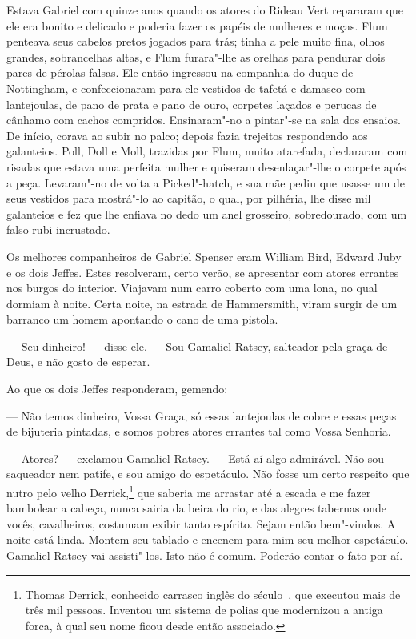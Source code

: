 Estava Gabriel com quinze anos quando os atores do Rideau Vert repararam
que ele era bonito e delicado e poderia fazer os papéis de mulheres e
moças. Flum penteava seus cabelos pretos jogados para trás; tinha a pele
muito fina, olhos grandes, sobrancelhas altas, e Flum furara"-lhe as
orelhas para pendurar dois pares de pérolas falsas. Ele então ingressou na
companhia do duque de Nottingham, e confeccionaram para ele vestidos de
tafetá e damasco com lantejoulas, de pano de prata e pano de ouro,
corpetes laçados e perucas de cânhamo com cachos compridos. Ensinaram"-no a
pintar"-se na sala dos ensaios. De início, corava ao subir no palco; depois
fazia trejeitos respondendo aos galanteios. Poll, Doll e Moll, trazidas
por Flum, muito atarefada, declararam com risadas que estava uma perfeita
mulher e quiseram desenlaçar"-lhe o corpete após a peça. Levaram"-no de
volta a Picked"-hatch, e sua mãe pediu que usasse um de seus vestidos para
mostrá"-lo ao capitão, o qual, por pilhéria, lhe disse mil galanteios e fez
que lhe enfiava no dedo um anel grosseiro, sobredourado, com um falso rubi
incrustado.

Os melhores companheiros de Gabriel Spenser eram William Bird, Edward Juby
e os dois Jeffes. Estes resolveram, certo verão, se apresentar com atores
errantes nos burgos do interior. Viajavam num carro coberto com uma lona,
no qual dormiam à noite. Certa noite, na estrada de Hammersmith, viram
surgir de um barranco um homem apontando o cano de uma pistola.

--- Seu dinheiro! --- disse ele. --- Sou Gamaliel Ratsey, salteador pela graça de
Deus, e não gosto de esperar.

Ao que os dois Jeffes responderam, gemendo:

--- Não temos dinheiro, Vossa Graça, só essas lantejoulas de cobre e essas
peças de bijuteria pintadas, e somos pobres atores errantes tal como Vossa
Senhoria.

--- Atores? --- exclamou Gamaliel Ratsey. --- Está aí algo admirável. Não sou
saqueador nem patife, e sou amigo do espetáculo. Não fosse um certo
respeito que nutro pelo velho Derrick,\footnote{ Thomas Derrick, conhecido
carrasco inglês do século~, que executou mais de três mil pessoas.
Inventou um sistema de polias que modernizou a antiga forca, à qual seu
nome ficou desde então associado.} que saberia me arrastar até a
escada e me fazer bambolear a cabeça, nunca sairia da beira do rio, e das
alegres tabernas onde vocês, cavalheiros, costumam exibir tanto espírito.
Sejam então bem"-vindos. A noite está linda. Montem seu tablado e encenem
para mim seu melhor espetáculo. Gamaliel Ratsey vai assisti"-los. Isto não
é comum. Poderão contar o fato por aí.

